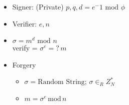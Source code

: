 \begin{itemize}
\begin{itemize}
\begin{itemize}
        \item Signer: (Private) $p, q, d = e^-1 \text{ mod } \phi$
        \item Verifier: $e,n$
        \item $\sigma = m^d \text{ mod } n$
        \\verify = $\sigma^e =?\,m$
        \item Forgery
            \begin{itemize}
            \item $\sigma = \text{Random String}$; $\sigma \in_R Z_N^*$
            \item $m = \sigma^e\,\text{mod}\,n$
            \end{itemize}
        \end{itemize}
    \end{itemize}
\end{itemize}
